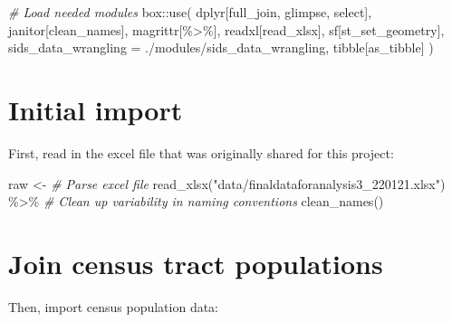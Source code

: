 \documentclass[
]{book}
\newenvironment{Shaded}{\begin{snugshade}}{\end{snugshade}}
\newcommand{\AttributeTok}[1]{\textcolor[rgb]{0.77,0.63,0.00}{#1}}
\newcommand{\CommentTok}[1]{\textcolor[rgb]{0.56,0.35,0.01}{\textit{#1}}}
\newcommand{\FunctionTok}[1]{\textcolor[rgb]{0.00,0.00,0.00}{#1}}
\newcommand{\NormalTok}[1]{#1}
\newcommand{\OtherTok}[1]{\textcolor[rgb]{0.56,0.35,0.01}{#1}}
\newcommand{\SpecialCharTok}[1]{\textcolor[rgb]{0.00,0.00,0.00}{#1}}
\newcommand{\StringTok}[1]{\textcolor[rgb]{0.31,0.60,0.02}{#1}}
\begin{document}
\begin{Shaded}
\begin{Highlighting}[]
\CommentTok{\# Load needed modules}
\NormalTok{box}\SpecialCharTok{::}\FunctionTok{use}\NormalTok{(}
\NormalTok{    dplyr[full\_join, glimpse, select],}
\NormalTok{    janitor[clean\_names],}
\NormalTok{    magrittr[}\StringTok{\textasciigrave{}}\AttributeTok{\%\textgreater{}\%}\StringTok{\textasciigrave{}}\NormalTok{],}
\NormalTok{    readxl[read\_xlsx],}
\NormalTok{    sf[st\_set\_geometry],}
    \AttributeTok{sids\_data\_wrangling =}\NormalTok{ .}\SpecialCharTok{/}\NormalTok{modules}\SpecialCharTok{/}\NormalTok{sids\_data\_wrangling,}
\NormalTok{    tibble[as\_tibble]}
\NormalTok{)}
\end{Highlighting}
\end{Shaded}

\hypertarget{initial-import}{%
\section{Initial import}\label{initial-import}}

First, read in the excel file that was originally shared for this project:

\begin{Shaded}
\begin{Highlighting}[]
\NormalTok{raw }\OtherTok{\textless{}{-}} 
    \CommentTok{\# Parse excel file}
    \FunctionTok{read\_xlsx}\NormalTok{(}\StringTok{"data/finaldataforanalysis3\_220121.xlsx"}\NormalTok{) }\SpecialCharTok{\%\textgreater{}\%}
    \CommentTok{\# Clean up variability in naming conventions}
    \FunctionTok{clean\_names}\NormalTok{()}
\end{Highlighting}
\end{Shaded}

\hypertarget{join-census-tract-populations}{%
\section{Join census tract populations}\label{join-census-tract-populations}}

Then, import census population data:
\end{document}
